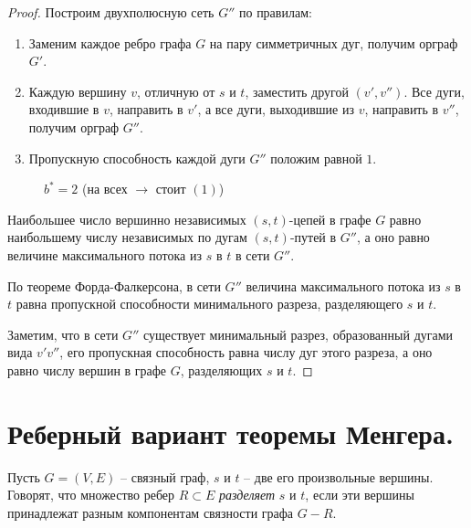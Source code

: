 \begin{proof}
    Построим двухполюсную сеть $ G'' $ по правилам:
    \begin{enumerate}
        \item Заменим каждое ребро графа $ G $ на пару симметричных дуг, получим орграф $ G' $.
        \item Каждую вершину $ v $, отличную от $ s $ и $ t $, заместить другой $ (v',v'') $. Все дуги, входившие в $ v $, направить в $ v' $, а все дуги, выходившие из $ v $, направить в $ v'' $, получим орграф $ G'' $.
        \item Пропускную способность каждой дуги $ G'' $ положим равной $ 1 $.
    \end{enumerate}
    \begin{figure}[H]
        \centering
    \end{figure}
    \begin{figure}[H]
        \centering
        \caption*{$ b^* = 2 $ (на всех $ \longrightarrow $ стоит $ (1) $)}
        \label{fig:fig_34}
    \end{figure}

    Наибольшее число вершинно независимых $ (s,t) $-цепей в графе $ G $ равно наибольшему числу независимых по дугам $ (s,t) $-путей в $ G'' $, а оно равно величине максимального потока из $ s $ в $ t $ в сети $ G'' $.

    По теореме Форда-Фалкерсона, в сети $ G'' $ величина максимального потока из $ s $ в $ t $ равна пропускной способности минимального разреза, разделяющего $ s $ и $ t $.

    Заметим, что в сети $ G'' $ существует минимальный разрез, образованный дугами вида $ v'v'' $, его пропускная способность равна числу дуг этого разреза, а оно равно числу вершин в графе $ G $, разделяющих $ s $ и $ t $.
\end{proof}

\newpage

\section{Реберный вариант теоремы Менгера.}

\begin{definition}
    Пусть $ G = (V,E) $ -- связный граф, $ s $ и $ t $ -- две его произвольные вершины. Говорят, что множество ребер $ R \subset E $ \emph{разделяет} $ s $ и $ t $, если эти вершины принадлежат разным компонентам связности графа $ G - R $.
\end{definition}

